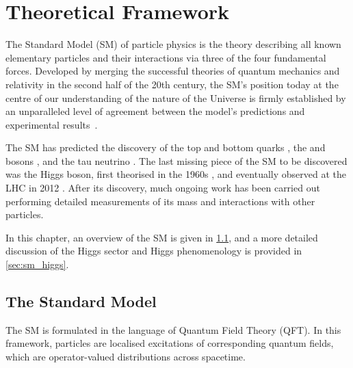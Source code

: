 \chapter{Theoretical Framework}\label{chap:theory}

The Standard Model (SM) of particle physics is the theory describing all known elementary particles and their interactions via three of the four fundamental forces.
Developed by merging the successful theories of quantum mechanics and relativity in the second half of the 20th century, the SM's position today at the centre of our understanding of the nature of the Universe is firmly established by an unparalleled level of agreement between the model's predictions and experimental results~\cite{morel2020determination,sailer2022measurement}.

The SM has predicted the discovery of the top and bottom quarks \cite{CDF:1995wbb,D0:1995jca,Herb:1977ek}, the \Wboson and \Zboson bosons \cite{UA1:1983crd}, and the tau neutrino \cite{DONUT:2000fbd}.
The last missing piece of the SM to be discovered was the Higgs boson, first theorised in the 1960s \cite{Englert:1964et,Higgs:1964pj,Guralnik:1964eu}, and eventually observed at the LHC in 2012 \cite{HIGG-2012-27,CMS-HIG-12-028}.
After its discovery, much ongoing work has been carried out performing detailed measurements of its mass and interactions with other particles.

In this chapter, an overview of the SM is given in \cref{sec:standard_model}, and a more detailed discussion of the Higgs sector and Higgs phenomenology is provided in \cref{sec:sm_higgs}.

\section{The Standard Model}\label{sec:standard_model}

The SM is formulated in the language of Quantum Field Theory (QFT).
In this framework, particles are localised excitations of corresponding quantum fields, which are operator-valued distributions across spacetime.


